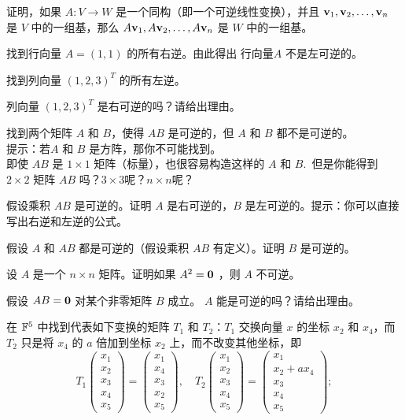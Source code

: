 \begin{problemset}
\item \label{ex:01-06-01} 证明，如果 $A: V \to W$ 是一个同构（即一个可逆线性变换），并且 $\mathbf{v}_1, \mathbf{v}_2, \dots, \mathbf{v}_n$ 是 $V$ 中的一组基，那么 $A \mathbf{v}_1, A \mathbf{v}_2, \dots, A \mathbf{v}_n$ 是 $W$ 中的一组基。
\item \label{ex:01-06-02} 找到行向量 $A = (1, 1)$ 的所有右逆。由此得出 行向量$A$ 不是左可逆的。
\item \label{ex:01-06-03} 找到列向量 $(1, 2, 3)^T$ 的所有左逆。
\item \label{ex:01-06-04} 列向量 $(1, 2, 3)^T$ 是右可逆的吗？请给出理由。
\item \label{ex:01-06-05} 找到两个矩阵 $A$ 和 $B$，使得 $AB$ 是可逆的，但 $A$ 和 $B$ 都不是可逆的。
\\
{\heiti 提示}：若$A$ 和 $B$ 是方阵，那你不可能找到。
\\
即使 $AB$ 是 $1 \times 1$ 矩阵（标量），也很容易构造这样的 $A$ 和 $B$.~但是你能得到 $2 \times 2$ 矩阵 $AB$ 吗？$3 \times 3$呢？$n \times n$呢？
\item \label{ex:01-06-06} 假设乘积 $AB$ 是可逆的。证明 $A$ 是右可逆的，$B$ 是左可逆的。提示：你可以直接写出右逆和左逆的公式。
\item \label{ex:01-06-07} 假设 $A$ 和 $AB$ 都是可逆的（假设乘积 $AB$ 有定义）。证明 $B$ 是可逆的。
\item \label{ex:01-06-08} 设 $A$ 是一个 $n \times n$ 矩阵。证明如果 $A^2 = \mathbf{0}$ ，则 $A$ 不可逆。
\item \label{ex:01-06-09} 假设 $AB = \mathbf{0}$ 对某个非零矩阵 $B$ 成立。 $A$ 能是可逆的吗？请给出理由。
\item \label{ex:01-06-10} 在 $\mathbb{F}^5$ 中找到代表如下变换的矩阵 $T_1$ 和 $T_2$：$T_1$ 交换向量 $x$ 的坐标 $x_2$ 和 $x_4$，而 $T_2$ 只是将 $x_4$ 的 $a$ 倍加到坐标 $x_2$ 上，而不改变其他坐标，即
$$T_1 \begin{pmatrix} x_1 \\ x_2 \\ x_3 \\ x_4 \\ x_5 \end{pmatrix} = \begin{pmatrix} x_1 \\ x_4 \\ x_3 \\ x_2 \\ x_5 \end{pmatrix},\quad T_2 \begin{pmatrix} x_1 \\ x_2 \\ x_3 \\ x_4 \\ x_5 \end{pmatrix} = \begin{pmatrix} x_1 \\ x_2 + ax_4 \\ x_3 \\ x_4 \\ x_5 \end{pmatrix};$$

\end{problemset}
